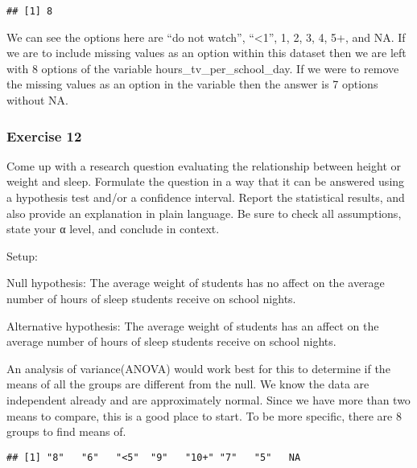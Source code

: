 \documentclass[
]{article}
\newenvironment{Shaded}{\begin{snugshade}}{\end{snugshade}}
\newcommand{\KeywordTok}[1]{\textcolor[rgb]{0.13,0.29,0.53}{\textbf{#1}}}
\newcommand{\NormalTok}[1]{#1}
\newcommand{\OperatorTok}[1]{\textcolor[rgb]{0.81,0.36,0.00}{\textbf{#1}}}
\begin{document}
\begin{verbatim}
## [1] 8
\end{verbatim}

We can see the options here are ``do not watch'', ``\textless1'', 1, 2,
3, 4, 5+, and NA. If we are to include missing values as an option
within this dataset then we are left with 8 options of the variable
hours\_tv\_per\_school\_day. If we were to remove the missing values as
an option in the variable then the answer is 7 options without NA.

\hypertarget{exercise-12}{%
\subsubsection{Exercise 12}\label{exercise-12}}

Come up with a research question evaluating the relationship between
height or weight and sleep. Formulate the question in a way that it can
be answered using a hypothesis test and/or a confidence interval. Report
the statistical results, and also provide an explanation in plain
language. Be sure to check all assumptions, state your α level, and
conclude in context.

Setup:

Null hypothesis: The average weight of students has no affect on the
average number of hours of sleep students receive on school nights.

Alternative hypothesis: The average weight of students has an affect on
the average number of hours of sleep students receive on school nights.

An analysis of variance(ANOVA) would work best for this to determine if
the means of all the groups are different from the null. We know the
data are independent already and are approximately normal. Since we have
more than two means to compare, this is a good place to start. To be
more specific, there are 8 groups to find means of.

\begin{Shaded}
\end{Shaded}

\begin{verbatim}
## [1] "8"   "6"   "<5"  "9"   "10+" "7"   "5"   NA
\end{verbatim}

\begin{Shaded}
\end{Shaded}
\end{document}
